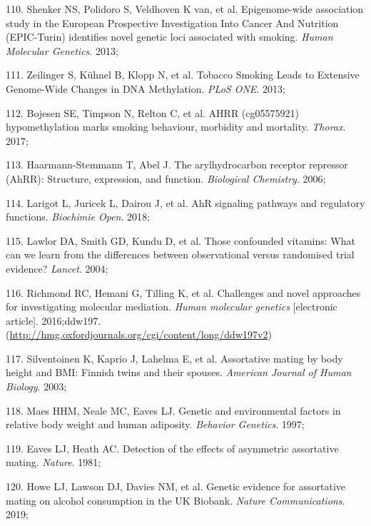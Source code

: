 \documentclass[11pt,oneside]{bristolthesis}
\newenvironment{cslreferences}%
  {}%
  {\par}
\begin{document}
\begin{cslreferences}
\leavevmode\hypertarget{ref-Shenker2013}{}%
110. Shenker NS, Polidoro S, Veldhoven K van, et al. Epigenome-wide association study in the European Prospective Investigation Into Cancer And Nutrition (EPIC-Turin) identifies novel genetic loci associated with smoking. \emph{Human Molecular Genetics}. 2013;

\leavevmode\hypertarget{ref-Zeilinger2013}{}%
111. Zeilinger S, Kühnel B, Klopp N, et al. Tobacco Smoking Leads to Extensive Genome-Wide Changes in DNA Methylation. \emph{PLoS ONE}. 2013;

\leavevmode\hypertarget{ref-Bojesen2017}{}%
112. Bojesen SE, Timpson N, Relton C, et al. AHRR (cg05575921) hypomethylation marks smoking behaviour, morbidity and mortality. \emph{Thorax}. 2017;

\leavevmode\hypertarget{ref-Haarmann-Stemmann2006}{}%
113. Haarmann-Stemmann T, Abel J. The arylhydrocarbon receptor repressor (AhRR): Structure, expression, and function. \emph{Biological Chemistry}. 2006;

\leavevmode\hypertarget{ref-Larigot2018}{}%
114. Larigot L, Juricek L, Dairou J, et al. AhR signaling pathways and regulatory functions. \emph{Biochimie Open}. 2018;

\leavevmode\hypertarget{ref-Lawlor2004}{}%
115. Lawlor DA, Smith GD, Kundu D, et al. Those confounded vitamins: What can we learn from the differences between observational versus randomised trial evidence? \emph{Lancet}. 2004;

\leavevmode\hypertarget{ref-Richmond2016}{}%
116. Richmond RC, Hemani G, Tilling K, et al. Challenges and novel approaches for investigating molecular mediation. \emph{Human molecular genetics} {[}electronic article{]}. 2016;ddw197. (\url{http://hmg.oxfordjournals.org/cgi/content/long/ddw197v2})

\leavevmode\hypertarget{ref-Silventoinen2003}{}%
117. Silventoinen K, Kaprio J, Lahelma E, et al. Assortative mating by body height and BMI: Finnish twins and their spouses. \emph{American Journal of Human Biology}. 2003;

\leavevmode\hypertarget{ref-Maes1997}{}%
118. Maes HHM, Neale MC, Eaves LJ. Genetic and environmental factors in relative body weight and human adiposity. \emph{Behavior Genetics}. 1997;

\leavevmode\hypertarget{ref-Eaves1981}{}%
119. Eaves LJ, Heath AC. Detection of the effects of asymmetric assortative mating. \emph{Nature}. 1981;

\leavevmode\hypertarget{ref-Howe2019}{}%
120. Howe LJ, Lawson DJ, Davies NM, et al. Genetic evidence for assortative mating on alcohol consumption in the UK Biobank. \emph{Nature Communications}. 2019;


\end{cslreferences}
\end{document}
